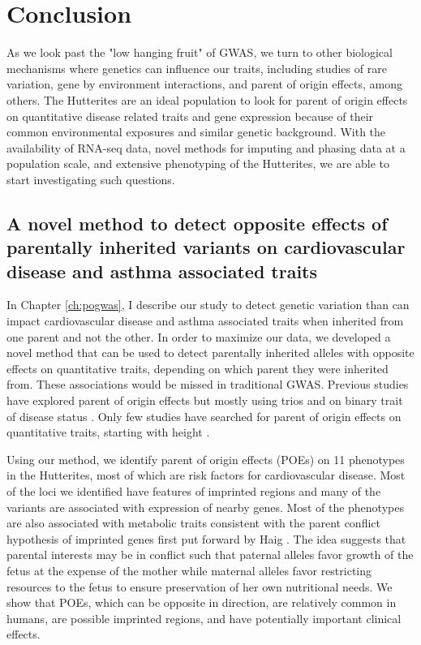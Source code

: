 \chapter{Conclusion}

As we look past the "low hanging fruit" of GWAS, we turn to other biological mechanisms where genetics can influence our traits, including studies of rare variation, gene by environment interactions, and parent of origin effects, among others. The Hutterites are an ideal population to look for parent of origin effects on quantitative disease related traits and gene expression because of their common environmental exposures and similar genetic background\cite{Weiss:2005cq,Abney2001,Ober:2001dy}. With the availability of RNA-seq data, novel methods for imputing and phasing data at a population scale\citep {Livne2015}, and extensive phenotyping of the Hutterites, we are able to start investigating such questions. 


\section{A novel method to detect opposite effects of parentally inherited variants on cardiovascular disease and asthma associated traits}
 
 In Chapter \ref{ch:pogwas}, I describe our study to detect genetic variation than can impact cardiovascular disease and asthma associated traits when inherited from one parent and not the other. In order to maximize our data, we developed a novel method that can be used to detect parentally inherited alleles with opposite effects on quantitative traits, depending on which parent they were inherited from. These associations would be missed in traditional GWAS. Previous studies have explored parent of origin effects but mostly using trios \cite{Garg2012a,Ainsworth:2010bp,Howey:2012hj} and on binary trait of disease status \cite{Kong:2009kk,Ainsworth:2010bp}. Only few studies have searched for parent of origin effects on quantitative traits, starting with height \cite{Benonisdottir:2016dz,Zoledziewska:2015do}.
 
Using our method, we identify parent of origin effects (POEs) on 11 phenotypes in the Hutterites, most of which are risk factors for cardiovascular disease. Most of the loci we identified have features of imprinted regions and many of the variants are associated with expression of nearby genes. Most of the phenotypes are also associated with metabolic traits consistent with the parent conflict hypothesis of imprinted genes first put forward by Haig \citep{Haig:2000if,Barlow:2014dv,Patten:2016cb}. The idea suggests that parental interests may be in conflict such that paternal alleles favor growth of the fetus at the expense of the mother while maternal alleles favor restricting resources to the fetus to ensure preservation of her own nutritional needs. We show that POEs, which can be opposite in direction, are relatively common in humans, are possible imprinted regions, and have potentially important clinical effects. 
 
